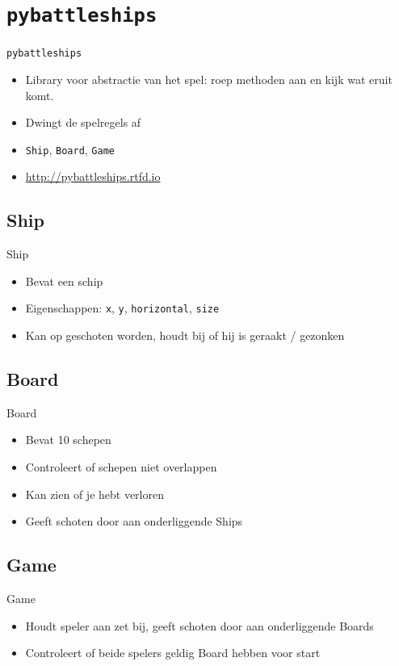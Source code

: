 \documentclass{beamer}
\begin{document}
\section{\texttt{pybattleships}}
\begin{frame}{\texttt{pybattleships}}
	\begin{itemize}
		\item Library voor abstractie van het spel: roep methoden aan en kijk wat eruit komt.
		\item Dwingt de spelregels af
		\item \texttt{Ship}, \texttt{Board}, \texttt{Game}
		\item \url{http://pybattleships.rtfd.io}
	\end{itemize}
\end{frame}

\subsection{Ship}
\begin{frame}{Ship}
	\begin{itemize}
		\item Bevat een schip
		\item Eigenschappen: \texttt{x}, \texttt{y}, \texttt{horizontal}, \texttt{size}
		\item Kan op geschoten worden, houdt bij of hij is geraakt / gezonken
	\end{itemize}
\end{frame}

\subsection{Board}
\begin{frame}{Board}
	\begin{itemize}
		\item Bevat 10 schepen
		\item Controleert of schepen niet overlappen
		\item Kan zien of je hebt verloren
		\item Geeft schoten door aan onderliggende Ships
	\end{itemize}
\end{frame}

\subsection{Game}
\begin{frame}{Game}
	\begin{itemize}
		\item Houdt speler aan zet bij, geeft schoten door aan onderliggende Boards
		\item Controleert of beide spelers geldig Board hebben voor start
	\end{itemize}
\end{frame}
\end{document}
